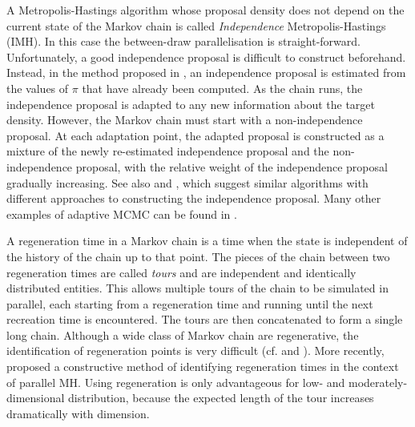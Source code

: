 \documentclass[11pt]{article}       %
\begin{document}
A Metropolis-Hastings algorithm whose proposal density does not depend on the
current state of the Markov chain is called \emph{Independence}
Metropolis-Hastings (IMH).  In this case the between-draw parallelisation is
straight-forward.  Unfortunately, a good independence proposal is difficult to
construct beforehand.  Instead, in the method proposed in
\cite{strid2010adaptive}, an independence proposal is estimated from the values
of $\pi$ that have already been computed.  As the chain runs, the independence
proposal is adapted to any new information about the target density.  However,
the Markov chain must start with a non-independence proposal.  At each
adaptation point, the adapted proposal is constructed as a mixture of the newly
re-estimated independence proposal and the non-independence proposal, with the
relative weight of the independence proposal gradually increasing.  See also
\cite{holden2009adaptive} and \cite{giordani2010adaptive}, which suggest
similar algorithms with different approaches to constructing the independence
proposal.  Many other examples of adaptive MCMC can be found in
\cite{roberts2009examples}.

A regeneration time in a Markov chain is a time when the state is independent of
the history of the chain up to that point.  The pieces of the chain between two
regeneration times are called \emph{tours} and are independent and identically
distributed entities.  This allows multiple tours of the chain to be simulated
in parallel, each starting from a regeneration time and running until the next
recreation time is encountered.  The tours are then concatenated to form a
single long chain.  Although a wide class of Markov chain are regenerative, the
identification of regeneration points is very difficult (cf.
\cite{mykland1995regeneration} and \cite{gilks1998adaptive}).  More recently,
\cite{brockwell2005identification} proposed a constructive method of
identifying regeneration times in the context of parallel MH.  Using
regeneration is only advantageous for low- and moderately-dimensional
distribution, because the expected length of the tour increases dramatically
with dimension.  
\end{document}
